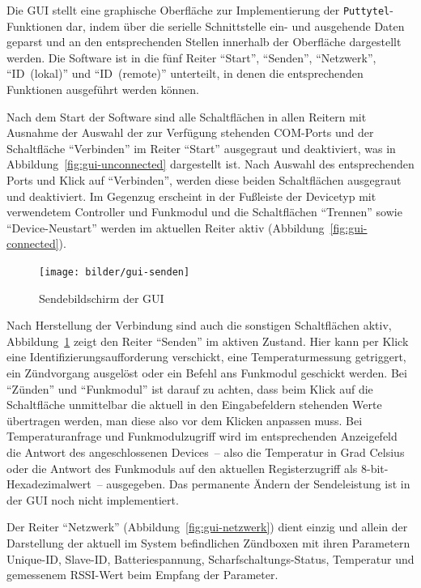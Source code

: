 \documentclass[paper=a4, parskip, numbers=noenddot, toc=listof, headsepline]{scrbook}
\begin{document}
			Die GUI stellt eine graphische Oberfläche zur Implementierung der \texttt{Puttytel}-Funktionen dar, indem über die serielle Schnittstelle ein- und ausgehende Daten geparst und an den entsprechenden Stellen innerhalb der Oberfläche dargestellt werden. Die Software ist in die fünf Reiter \enquote{Start}, \enquote{Senden}, \enquote{Netzwerk}, \enquote{ID~(lokal)} und \enquote{ID~(remote)} unterteilt, in denen die entsprechenden Funktionen ausgeführt werden können.

			Nach dem Start der Software sind alle Schaltflächen in allen Reitern mit Ausnahme der Auswahl der zur Verfügung stehenden COM-Ports und der Schaltfläche \enquote{Verbinden} im Reiter \enquote{Start} ausgegraut und deaktiviert, was in Abbildung~\ref{fig:gui-unconnected} dargestellt ist. Nach Auswahl des entsprechenden Ports und Klick auf \enquote{Verbinden}, werden diese beiden Schaltflächen ausgegraut und deaktiviert. Im Gegenzug erscheint in der Fußleiste der Devicetyp mit verwendetem Controller und Funkmodul und die Schaltflächen \enquote{Trennen} sowie \enquote{Device-Neustart} werden im aktuellen Reiter aktiv (Abbildung~\ref{fig:gui-connected}).%
			\begin{figure}[!b]
				\centering
				\texttt{[image: bilder/gui-senden]}
				\caption{Sendebildschirm der GUI}
				\label{fig:gui-senden}
			\end{figure}

			Nach Herstellung der Verbindung sind auch die sonstigen Schaltflächen aktiv, Abbildung~\ref{fig:gui-senden} zeigt den Reiter \enquote{Senden} im aktiven Zustand. Hier kann per Klick eine Identifizierungsaufforderung verschickt, eine Temperaturmessung getriggert, ein Zündvorgang ausgelöst oder ein Befehl ans Funkmodul geschickt werden. Bei \enquote{Zünden} und \enquote{Funkmodul} ist darauf zu achten, dass beim Klick auf die Schaltfläche unmittelbar die aktuell in den Eingabefeldern stehenden Werte übertragen werden, man diese also vor dem Klicken anpassen muss. Bei Temperaturanfrage und Funkmodulzugriff wird im entsprechenden Anzeigefeld die Antwort des angeschlossenen Devices~-- also die Temperatur in Grad Celsius oder die Antwort des Funkmoduls auf den aktuellen Registerzugriff als 8-bit-Hexadezimalwert~-- ausgegeben. Das permanente Ändern der Sendeleistung ist in der GUI noch nicht implementiert.

			Der Reiter \enquote{Netzwerk} (Abbildung~\ref{fig:gui-netzwerk}) dient einzig und allein der Darstellung der aktuell im System befindlichen Zündboxen mit ihren Parametern Unique-ID, Slave-ID, Batteriespannung, Scharf\-schaltungs-Status, Temperatur und gemessenem RSSI-Wert beim Empfang der Parameter.
\end{document}
